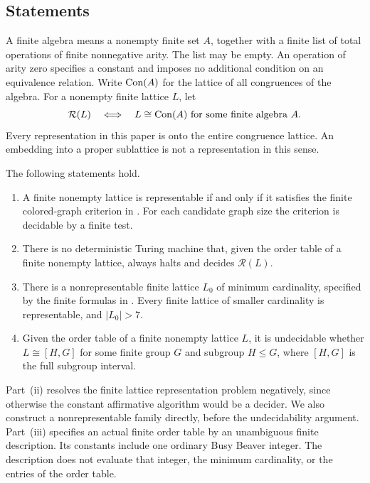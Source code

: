 \subsection{Statements}

A finite algebra means a nonempty finite set \(A\), together with a finite
list of total operations of finite nonnegative arity.  The list may be
empty.  An operation of arity zero specifies a constant and imposes no
additional condition on an equivalence relation.
Write \(\operatorname{Con}(A)\) for the lattice of all congruences of the algebra.
For a nonempty finite lattice \(L\), let
\[
 \mathcal R(L)\quad\Longleftrightarrow\quad
 L\cong\operatorname{Con}(A)\text{ for some finite algebra }A .
\]
Every representation in this paper is onto the entire congruence lattice.
An embedding into a proper sublattice is not a representation in this sense.

\begin{theorem}\label{m:main}
The following statements hold.
\begin{enumerate}[label=\textup{(\roman*)}]
\item A finite nonempty lattice is representable if and only if it satisfies
the finite colored-graph criterion in .
For each candidate graph size the criterion is decidable by a finite test.
\item There is no deterministic Turing machine that, given the order table
of a finite nonempty lattice, always halts and decides \(\mathcal R(L)\).
\item There is a nonrepresentable finite lattice \(L_0\) of minimum
cardinality, specified by the finite formulas in .
Every finite lattice of smaller cardinality is representable, and
\(\lvert L_0\rvert>7\).
\item Given the order table of a finite nonempty lattice \(L\), it is
undecidable whether \(L\cong[H,G]\) for some finite group \(G\) and
subgroup \(H\le G\), where \([H,G]\) is the full subgroup interval.
\end{enumerate}
\end{theorem}

Part~\textup{(ii)} resolves the finite lattice representation problem
negatively, since otherwise the constant affirmative algorithm would be a
decider.  We also construct a nonrepresentable family directly, before the
undecidability argument.  Part~\textup{(iii)} specifies an actual finite
order table by an unambiguous finite description.  Its constants include
one ordinary Busy Beaver integer.  The description does not evaluate
that integer, the minimum cardinality, or the entries of the order table.

